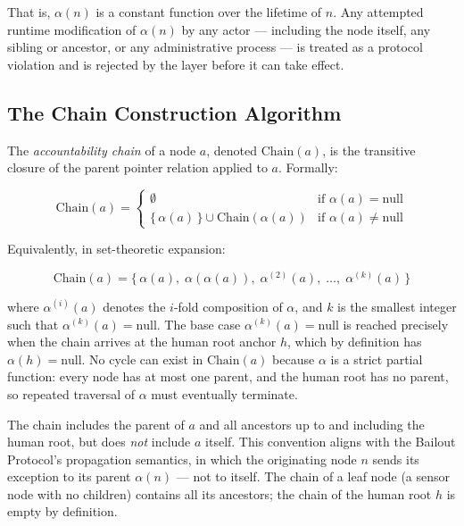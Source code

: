 That is, $\alpha(n)$ is a constant function over the lifetime of $n$. Any attempted runtime modification of $\alpha(n)$ by any actor — including the node itself, any sibling or ancestor, or any administrative process — is treated as a protocol violation and is rejected by the \fact{} layer before it can take effect.

\subsection{The Chain Construction Algorithm}

The \emph{accountability chain} of a node $a$, denoted $\text{Chain}(a)$, is the transitive closure of the parent pointer relation applied to $a$. Formally:

\begin{equation}
\text{Chain}(a) = 
\begin{cases}
\emptyset & \text{if } \alpha(a) = \text{null} \\[6pt]
\{\,\alpha(a)\,\} \cup \text{Chain}(\alpha(a)) & \text{if } \alpha(a) \neq \text{null}
\end{cases}
\tag{CH-1}
\end{equation}

Equivalently, in set-theoretic expansion:

\begin{equation}
\text{Chain}(a) = \{\,\alpha(a),\; \alpha(\alpha(a)),\; \alpha^{(2)}(a),\; \dots,\; \alpha^{(k)}(a)\,\}
\tag{CH-2}
\end{equation}

where $\alpha^{(i)}(a)$ denotes the $i$-fold composition of $\alpha$, and $k$ is the smallest integer such that $\alpha^{(k)}(a) = \text{null}$. The base case $\alpha^{(k)}(a) = \text{null}$ is reached precisely when the chain arrives at the human root anchor $h$, which by definition has $\alpha(h) = \text{null}$. No cycle can exist in $\text{Chain}(a)$ because $\alpha$ is a strict partial function: every node has at most one parent, and the human root has no parent, so repeated traversal of $\alpha$ must eventually terminate.

The chain includes the parent of $a$ and all ancestors up to and including the human root, but does \emph{not} include $a$ itself. This convention aligns with the Bailout Protocol's propagation semantics, in which the originating node $n$ sends its exception to its parent $\alpha(n)$ — not to itself. The chain of a leaf node (a sensor node with no children) contains all its ancestors; the chain of the human root $h$ is empty by definition.

